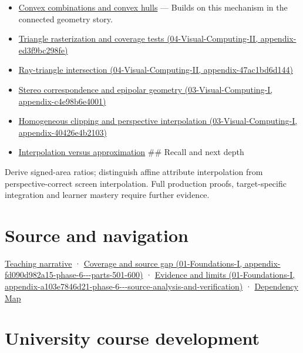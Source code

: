 \begin{itemize}
\item
  \hyperref[appendix-0026ec42c9d5]{Convex combinations and convex hulls} --- Builds on this mechanism in the connected geometry story.
\item
  \href{../04-Visual-Computing-II/main.pdf\#nameddest=appendix-ed3f9bc298fe}{Triangle rasterization and coverage tests (04-Visual-Computing-II, appendix-ed3f9bc298fe)}
\item
  \href{../04-Visual-Computing-II/main.pdf\#nameddest=appendix-47ac1bd6d144}{Ray-triangle intersection (04-Visual-Computing-II, appendix-47ac1bd6d144)}
\item
  \href{../03-Visual-Computing-I/main.pdf\#nameddest=appendix-c4e98b6e4001}{Stereo correspondence and epipolar geometry (03-Visual-Computing-I, appendix-c4e98b6e4001)}
\item
  \href{../03-Visual-Computing-I/main.pdf\#nameddest=appendix-40426e4b2103}{Homogeneous clipping and perspective interpolation (03-Visual-Computing-I, appendix-40426e4b2103)}
\item
  \hyperref[appendix-0c2a5f69851e]{Interpolation versus approximation} \#\# Recall and next depth
\end{itemize}

Derive signed-area ratios; distinguish affine attribute interpolation from perspective-correct screen interpolation. Full production proofs, target-specific integration and learner mastery require further evidence.

\section{Source and navigation}\label{appendix-02b9d9a81dca-source-and-navigation}

\href{Continuous\%20Notes/Computing\%20Foundations\%20-\%20From\%20Bits\%20to\%20C++\%20and\%20Systems\%20APIs\#The\%20sensor\%20needs\%20coordinates\%20inside\%20the\%20triangle}{Teaching narrative} · \href{../01-Foundations-I/main.pdf\#nameddest=appendix-fd090d982a15-phase-6---parts-501-600}{Coverage and source gap (01-Foundations-I, appendix-fd090d982a15-phase-6-\/-\/-parts-501-600)} · \href{../01-Foundations-I/main.pdf\#nameddest=appendix-a103e7846d21-phase-6---source-analysis-and-verification}{Evidence and limits (01-Foundations-I, appendix-a103e7846d21-phase-6-\/-\/-source-analysis-and-verification)} · \hyperref[appendix-4ad47bdd269a]{Dependency Map}

\section{University course development}\label{appendix-02b9d9a81dca-university-course-development}

